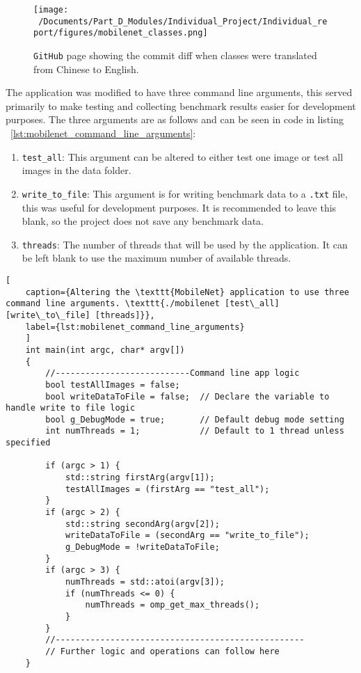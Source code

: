 \begin{figure}[H] %
	\centering
	\texttt{[image: ~/Documents/Part\_D\_Modules/Individual\_Project/Individual\_report/figures/mobilenet\_classes.png]} %
	\caption{\texttt{GitHub} page showing the commit diff when classes were translated from Chinese to English. }
	\label{fig:mobilenet_classes} %
\end{figure}

The application was modified to have three command line arguments, this served primarily to make testing and collecting benchmark results easier for development purposes. The three arguments are as follows and can be seen in code in listing ~\ref{lst:mobilenet_command_line_arguments}:

\begin{enumerate}
	\item \texttt{test\_all}: This argument can be altered to either test one image or test all images in the data folder.  
	\item \texttt{write\_to\_file}: This argument is for writing benchmark data to a \texttt{.txt} file, this was useful for development purposes. It is recommended to leave this blank, so the project does not save any benchmark data. 
	\item \texttt{threads}: The number of threads that will be used by the application. It can be left blank to use the maximum number of available threads.  
\end{enumerate}

\begin{lstlisting}[
	caption={Altering the \texttt{MobileNet} application to use three command line arguments. \texttt{./mobilenet [test\_all] [write\_to\_file] [threads]}},
	label={lst:mobilenet_command_line_arguments}
	]
	int main(int argc, char* argv[])
	{
		//---------------------------Command line app logic
		bool testAllImages = false;
		bool writeDataToFile = false;  // Declare the variable to handle write to file logic
		bool g_DebugMode = true;       // Default debug mode setting
		int numThreads = 1;            // Default to 1 thread unless specified
		
		if (argc > 1) {
			std::string firstArg(argv[1]);
			testAllImages = (firstArg == "test_all");
		}
		if (argc > 2) {
			std::string secondArg(argv[2]);
			writeDataToFile = (secondArg == "write_to_file");
			g_DebugMode = !writeDataToFile; 
		}
		if (argc > 3) {
			numThreads = std::atoi(argv[3]);
			if (numThreads <= 0) {
				numThreads = omp_get_max_threads();  
			}
		}
		//--------------------------------------------------
		// Further logic and operations can follow here
	}
\end{lstlisting}


